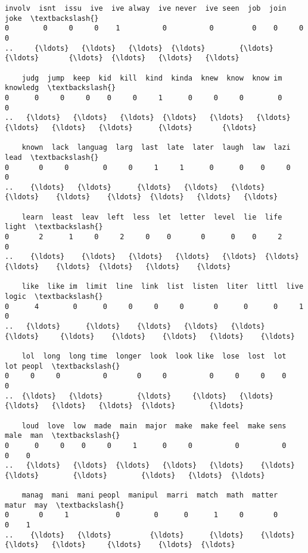 \documentclass[11pt]{article}
\begin{document}
\begin{Verbatim}[commandchars=\\\{\}]
    involv  isnt  issu  ive  ive alway  ive never  ive seen  job  join  joke  \textbackslash{}
0        0     0     0    1          0          0         0    0     0     0   
..     {\ldots}   {\ldots}   {\ldots}  {\ldots}        {\ldots}        {\ldots}       {\ldots}  {\ldots}   {\ldots}   {\ldots}   

    judg  jump  keep  kid  kill  kind  kinda  knew  know  know im  knowledg  \textbackslash{}
0      0     0     0    0     0     1      0     0     0        0         0   
..   {\ldots}   {\ldots}   {\ldots}  {\ldots}   {\ldots}   {\ldots}    {\ldots}   {\ldots}   {\ldots}      {\ldots}       {\ldots}   

    known  lack  languag  larg  last  late  later  laugh  law  lazi  lead  \textbackslash{}
0       0     0        0     0     1     1      0      0    0     0     0   
..    {\ldots}   {\ldots}      {\ldots}   {\ldots}   {\ldots}   {\ldots}    {\ldots}    {\ldots}  {\ldots}   {\ldots}   {\ldots}   

    learn  least  leav  left  less  let  letter  level  lie  life  light  \textbackslash{}
0       2      1     0     2     0    0       0      0    0     2      0   
..    {\ldots}    {\ldots}   {\ldots}   {\ldots}   {\ldots}  {\ldots}     {\ldots}    {\ldots}  {\ldots}   {\ldots}    {\ldots}   

    like  like im  limit  line  link  list  listen  liter  littl  live  logic  \textbackslash{}
0      4        0      0     0     0     0       0      0      0     1      0   
..   {\ldots}      {\ldots}    {\ldots}   {\ldots}   {\ldots}   {\ldots}     {\ldots}    {\ldots}    {\ldots}   {\ldots}    {\ldots}   

    lol  long  long time  longer  look  look like  lose  lost  lot  lot peopl  \textbackslash{}
0     0     0          0       0     0          0     0     0    0          0   
..  {\ldots}   {\ldots}        {\ldots}     {\ldots}   {\ldots}        {\ldots}   {\ldots}   {\ldots}  {\ldots}        {\ldots}   

    loud  love  low  made  main  major  make  make feel  make sens  male  man  \textbackslash{}
0      0     0    0     0     1      0     0          0          0     0    0   
..   {\ldots}   {\ldots}  {\ldots}   {\ldots}   {\ldots}    {\ldots}   {\ldots}        {\ldots}        {\ldots}   {\ldots}  {\ldots}   

    manag  mani  mani peopl  manipul  marri  match  math  matter  matur  may  \textbackslash{}
0       0     1           0        0      0      1     0       0      0    1   
..    {\ldots}   {\ldots}         {\ldots}      {\ldots}    {\ldots}    {\ldots}   {\ldots}     {\ldots}    {\ldots}  {\ldots}   


\end{Verbatim}
\end{document}
